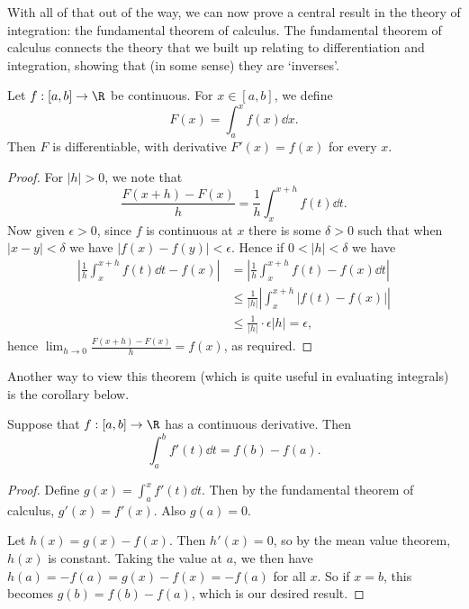 With all of that out of the way, we can now prove a central result in the theory of integration: the fundamental theorem of calculus. The fundamental theorem of calculus connects the theory that we built up relating to differentiation and integration, showing that (in some sense) they are `inverses'.

\begin{theorem}
	Let $f: [a, b] \rightarrow \R $ be continuous. For $x \in [a, b]$, we define
	$$
	F(x) = \int_a^x f(x) \dd x.
	$$
	Then $F$ is differentiable, with derivative $F'(x) = f(x)$ for every $x$.
\end{theorem}
\begin{proof}
	For $|h| > 0$, we note that
	$$
	\frac{F(x + h) - F(x)}{h} = \frac{1}{h} \int_x^{x + h} f(t) \dd t.
	$$
	Now given $\epsilon > 0$, since $f$ is continuous at $x$ there is some $\delta > 0$ such that when $|x - y| < \delta$ we have $|f(x) - f(y)| < \epsilon$. Hence if $0 < |h| < \delta$ we have
	\begin{align*}
		\left|\frac{1}{h} \int_x^{x + h} f(t) \dd t - f(x)\right| &= \left|\frac{1}{h} \int_x^{x + h} f(t)  - f(x)\dd t\right| \\
		&\leq \frac{1}{|h|} \left|\int_x^{x + h} |f(t) - f(x)|\right| \\ 
		& \leq \frac{1}{|h|} \cdot \epsilon|h| = \epsilon,
	\end{align*}
	hence $\lim_{h \to 0}\frac{F(x + h)- F(x)}{h} = f(x)$, as required.
\end{proof}


Another way to view this theorem (which is quite useful in evaluating integrals) is the corollary below.

\begin{corollary}
	Suppose that $f: [a, b] \rightarrow \R$ has a continuous derivative. Then
	$$
	\int_a^b f'(t) \dd t = f(b) - f(a).
	$$
\end{corollary}
\begin{proof}
	Define $g(x) = \int_a^x f'(t) \dd t$. Then by the fundamental theorem of calculus, $g'(x) = f'(x)$. Also $g(a) = 0$.

	Let $h(x) = g(x) - f(x)$. Then $h'(x) = 0$, so by the mean value theorem, $h(x)$ is constant. Taking the value at $a$, we then have $h(a) = -f(a) = g(x) - f(x) = -f(a)$ for all $x$. So if $x = b$, this becomes $g(b) = f(b) - f(a)$, which is our desired result.
\end{proof}


